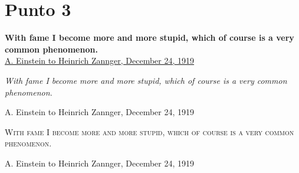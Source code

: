 \documentclass{article}
\begin{document}
\section*{Punto 3}
\textbf{With fame I become more and more stupid, which of course is a very common phenomenon.}\\
\underline{A. Einstein to Heinrich Zannger, December 24, 1919}\\

\begin{center}
\textit{With fame I become more and more stupid, which of course is a very common phenomenon.}\\
\begin{small}
A. Einstein to Heinrich Zannger, December 24, 1919
\end{small}
\end{center}

\begin{flushright}
\textsc{With fame I become more and more stupid, which of course is a very common phenomenon.}\\
\begin{small}
A. Einstein to Heinrich Zannger, December 24, 1919
\end{small}
\end{flushright}
\end{document}
